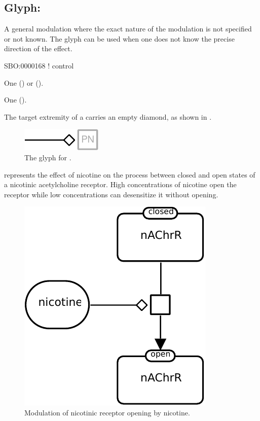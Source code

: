 \subsection{Glyph: }
\label{sec:modulation}


A general modulation where the exact nature of the modulation is not specified or not known.
The  glyph can be used when one does not know the precise direction of the effect.

\begin{glyphDescription}

\glyphSboTerm
SBO:0000168 ! control

\glyphOrigin
One  () or   ().

\glyphTarget
One  ().

\glyphSymbol
The target extremity of a  carries an empty diamond, as shown in .

\end{glyphDescription}

\begin{figure}[H]
  \centering
  \includegraphics{images/build/modulation.pdf}
  \caption{The \PD glyph for .}
  \label{fig:modulation}
\end{figure}

 represents the effect of nicotine on the process between closed and open states of a nicotinic acetylcholine receptor. High concentrations of nicotine open the receptor while low concentrations can desensitize it without opening.

\begin{figure}[H]
  \centering
  \includegraphics[scale = 0.8]{images/build/modulation_nAChR_example.pdf}
  \caption{Modulation of nicotinic receptor opening by nicotine.}
  \label{fig:modul-nico}
\end{figure}
